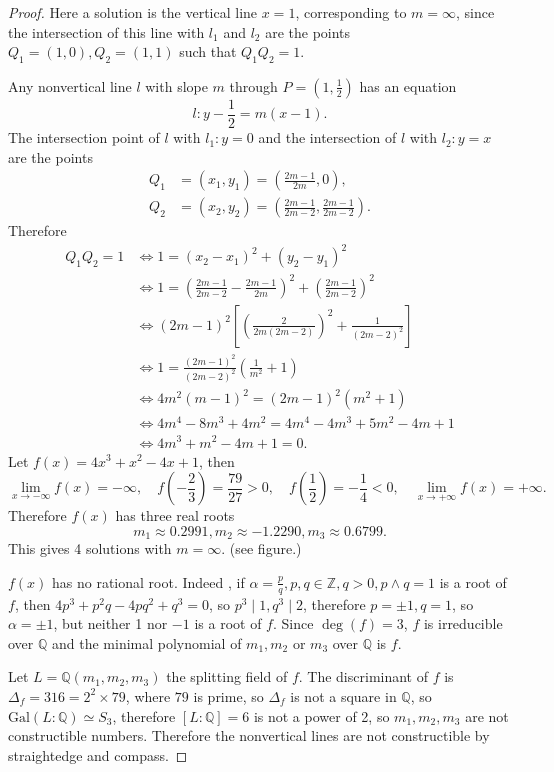 \documentclass[11pt,a4paper]{article}
\newcommand{\Q}{\mathbb{Q}}
\newcommand{\Z}{\mathbb{Z}}
\newcommand{\Gal}{\mathrm{Gal}}
\begin{document}
\begin{proof}
Here a solution is the vertical line $x = 1$, corresponding to $m = \infty$, since the intersection of this line with $l_1$ and $l_2$ are the points $Q_1=(1,0), Q_2 = (1,1)$ such that $Q_1Q_2 = 1$.

Any nonvertical line $l$ with slope $m$ through $P = (1,\frac{1}{2})$ has an equation
$$l : y - \frac{1}{2} = m (x-1).$$
The intersection point of $l$ with $l_1 : y = 0$ and the intersection of $l$ with $l_2 : y=x$ are the points
\begin{align*}
Q_1 &= (x_1,y_1) =  \left (\frac{2m-1}{2m},0 \right),\\
Q_2 &= (x_2,y_2) =  \left (\frac{2m-1}{2m-2}, \frac{2m-1}{2m-2} \right).
\end{align*}
Therefore
\begin{align*}
Q_1Q_2 = 1 &\iff1= (x_2-x_1)^2 + (y_2-y_1)^2\\
&\iff 1=\left(\frac{2m-1}{2m-2} - \frac{2m-1}{2m} \right)^2 + \left(\frac{2m-1}{2m-2} \right)^2\\
&\iff (2m-1)^2 \left[ \left(\frac{2}{2m(2m-2)} \right)^2 + \frac{1}{(2m-2)^2} \right]\\
&\iff 1 = \frac{(2m-1)^2}{(2m-2)^2} \left ( \frac{1}{m^2} + 1 \right)\\
&\iff 4m^2(m-1)^2 = (2m-1)^2(m^2 + 1)\\
&\iff 4m^4 - 8m^3 + 4m^2 = 4 m^4 - 4m^3+ 5m^2 - 4m+1\\
&\iff 4m^3+m^2 - 4m+1 = 0.
\end{align*}
Let $f(x) = 4x^3+x^2-4x+1$, then 
$$\lim_{x \to -\infty}f(x) = -\infty,\quad  f\left(-\frac{2}{3}\right) = \frac{79}{27} >0,\quad  f\left(\frac{1}{2}\right) = -\frac{1}{4}<0,\quad  \lim_{x \to +\infty} f(x)= +\infty.$$ Therefore $f(x)$ has three real roots
$$m_1 \approx 0.2991, m_2 \approx -1.2290, m_3 \approx 0.6799.$$
This gives 4 solutions with $m=\infty$.
(see figure.)

$f(x)$ has no rational root. Indeed , if $\alpha = \frac{p}{q}, p,q \in \Z, q>0, p\wedge q = 1$ is a root of $f$, then $4p^3+p^2q-4pq^2+q^3 = 0$, so $p^3 \mid 1, q^3 \mid 2$, therefore $p = \pm 1, q =1$, so $\alpha = \pm 1$, but neither 1 nor $-1$ is a root of $f$. Since $\deg(f) = 3$, $f$ is irreducible over $\Q$ and the minimal polynomial of $m_1,m_2$ or $m_3$ over $\Q$ is $f$.

Let $L = \Q(m_1,m_2,m_3)$ the splitting field of $f$.
The discriminant of $f$ is $\Delta_f = 316 = 2^2 \times 79$, where $79$ is prime, so $\Delta_f$ is not a square in $\Q$, so $\Gal(L:\Q) \simeq S_3$, therefore $[L:\Q] = 6$ is not a power of 2, so $m_1,m_2,m_3$ are not constructible numbers. Therefore the nonvertical lines are not constructible by straightedge and compass.
\end{proof}
\end{document}
